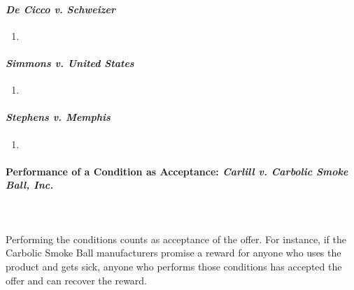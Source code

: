 \paragraph{\emph{De Cicco v.  Schweizer}}

\begin{enumerate}
    \item %
\end{enumerate}

\paragraph{\emph{Simmons v. United States}}

\begin{enumerate}
    \item %
\end{enumerate}

\paragraph{\emph{Stephens v. Memphis}}

\begin{enumerate}
    \item %
\end{enumerate}

\paragraph{Performance of a Condition as Acceptance: \emph{Carlill v. Carbolic 
Smoke Ball, Inc.}}
~\\\\
Performing the conditions counts as acceptance of the offer. For 
instance, if the Carbolic Smoke Ball manufacturers promise a reward for anyone 
who uses the product and gets sick, anyone who performs those conditions has 
accepted the offer and can recover the reward.

